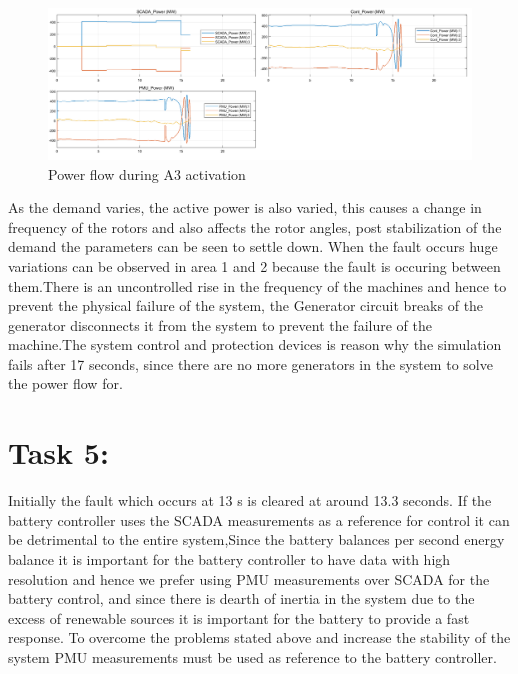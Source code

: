 \begin{figure}[H]
    \centering
        \includegraphics[width=0.8 \linewidth]{images_a4/T4.png}
        \caption{Power flow during A3 activation}
        \label{fig:machine_t4}   
\end{figure}
As the demand varies, the active power is also varied, this causes a change in frequency of the rotors and also affects the rotor angles, post stabilization of the demand the parameters can be seen to settle down.
When the fault occurs huge variations can be observed in area 1 and 2 because the fault is occuring between them.There is an uncontrolled rise in the frequency of the machines and hence to prevent the physical failure of the system, the Generator circuit breaks of the generator disconnects it from the system to prevent the failure of the machine.The system control and protection devices is reason why the simulation fails after 17 seconds, since there are no more generators in the system to solve the power flow for.
\section*{\textbf{Task 5}:}
Initially the fault which occurs at 13 s is cleared at around 13.3 seconds. If the battery controller uses the SCADA measurements as a reference for control it can be detrimental to the entire system,Since the battery balances per second energy balance it is important for the battery controller to have data with high resolution and hence we prefer using PMU measurements over SCADA for the battery control, and since there is dearth of inertia in the system due to the excess of renewable sources it is important for the battery to provide a fast response.
To overcome the problems stated above and increase the stability of the system PMU measurements must be used as reference to the battery controller.

